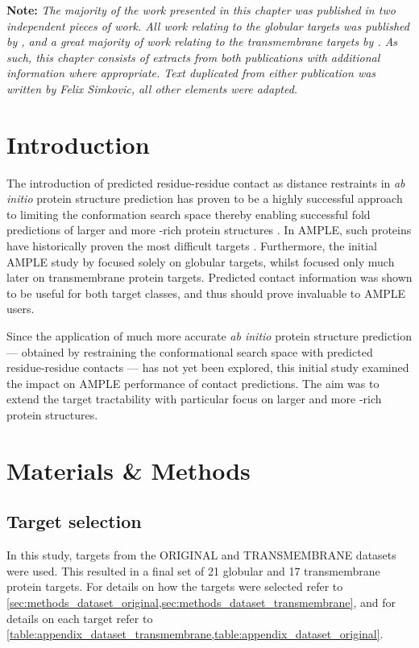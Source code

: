 \textbf{Note: }\textit{The majority of the work presented in this chapter was published in two independent pieces of work. All work relating to the globular targets was published by \textcite{Simkovic2016-wk}, and a great majority of work relating to the transmembrane targets by \textcite{Thomas2017-sh}. As such, this chapter consists of extracts from both publications with additional information where appropriate. Text duplicated from either publication was written by Felix Simkovic, all other elements were adapted.}

\section{Introduction}
The introduction of predicted residue-residue contact as distance restraints in \textit{ab initio} protein structure prediction has proven to be a highly successful approach to limiting the conformation search space thereby enabling successful fold predictions of larger and more \textbeta-rich protein structures \cite[e.g.,][]{Marks2011-os,Michel2014-eg,Kosciolek2014-bt,Ovchinnikov2015-tn,Ovchinnikov2016-jj,Michel2017-xh,De_Oliveira2017-sg,Ovchinnikov2017-nd,Wang2017-rx}. In AMPLE, such proteins have historically proven the most difficult targets \cite{Bibby2012-lm}. Furthermore, the initial AMPLE study by \textcite{Bibby2012-lm} focused solely on globular targets, whilst \textcite{Thomas2017-qu} focused only much later on transmembrane protein targets. Predicted contact information was shown to be useful for both target classes, and thus should prove invaluable to AMPLE users.

Since the application of much more accurate \textit{ab initio} protein structure prediction --- obtained by restraining the conformational search space with predicted residue-residue contacts --- has not yet been explored, this initial study examined the impact on AMPLE performance of contact predictions. The aim was to extend the target tractability with particular focus on larger and more \textbeta-rich protein structures.

\section{Materials \& Methods}
\subsection{Target selection}
In this study, targets from the ORIGINAL and TRANSMEMBRANE datasets were used. This resulted in a final set of 21 globular and 17 transmembrane protein targets. For details on how the targets were selected refer to \cref{sec:methods_dataset_original,sec:methods_dataset_transmembrane}, and for details on each target refer to \cref{table:appendix_dataset_transmembrane,table:appendix_dataset_original}.

